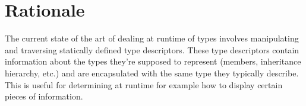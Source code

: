 \section{Rationale}

The current state of the art of dealing at runtime of types involves
manipulating and traversing statically defined type descriptors. These type
descriptors contain information about the types they’re supposed to represent
(members, inheritance hierarchy, etc.) and are encapsulated with the same type
they typically describe. This is useful for determining at runtime for example
how to display certain pieces of information.




